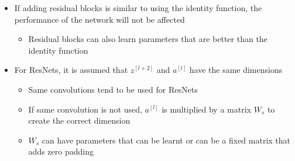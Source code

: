 \documentclass[12pt, letterpaper]{article}
\begin{document}
\begin{itemize}
\begin{itemize}
        \end{itemize}
        \item If adding residual blocks is similar to using the identity function, the performance of the network will not be affected
        \begin{itemize}
            \item Residual blocks can also learn parameters that are better than the identity function
        \end{itemize}
        \item For ResNets, it is assumed that $z^{[l+2]}$ and $a^{[l]}$ have the same dimensions
        \begin{itemize}
            \item Same convolutions tend to be used for ResNets
            \item If same convolution is not used, $a^{[l]}$ is multiplied by a matrix $W_s$ to create the correct dimension
            \item $W_s$ can have parameters that can be learnt or can be a fixed matrix that adds zero padding
        \end{itemize}
    \end{itemize}
    
\end{document}
